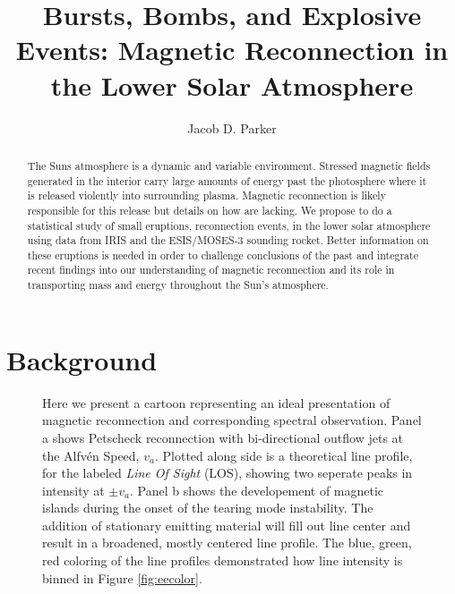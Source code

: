 \documentclass[]{aastex6}
\begin{document}
\title{Bursts, Bombs, and Explosive Events: Magnetic Reconnection in the Lower Solar Atmosphere} 

\author{Jacob D. Parker}





\begin{abstract}
	The Suns atmosphere is a dynamic and variable environment.  Stressed magnetic fields generated in the interior carry large amounts of energy past the photosphere where it is released violently into surrounding plasma.  Magnetic reconnection is likely responsible for this release but details on how are lacking.  We propose to do a statistical study of small eruptions, reconnection events, in the lower solar atmosphere using data from IRIS and the ESIS/MOSES-3 sounding rocket.  Better information on these eruptions is needed in order to challenge conclusions of the past and integrate recent findings into our understanding of magnetic reconnection and its role in transporting mass and energy throughout the Sun's atmosphere.

\end{abstract}

\section{Background}

	\begin{figure}
		\label{fig:reconnect}
		\caption{Here we present a cartoon representing an ideal presentation of magnetic reconnection and corresponding spectral observation.  Panel a shows Petscheck reconnection with bi-directional outflow jets at the Alfv\'en Speed, $v_a$.  Plotted along side is a theoretical line profile, for the labeled \textit{Line Of Sight} (LOS), showing two seperate peaks in intensity at $\pm v_a$. Panel b shows the developement of magnetic islands during the onset of the tearing mode instability.  The addition of stationary emitting material will fill out line center and result in a broadened, mostly centered line profile. The blue, green, red coloring of the line profiles demonstrated how line intensity is binned in Figure \ref{fig:eecolor}.}
		
		\centerline{} 
		
	\end{figure}  
\end{document}
